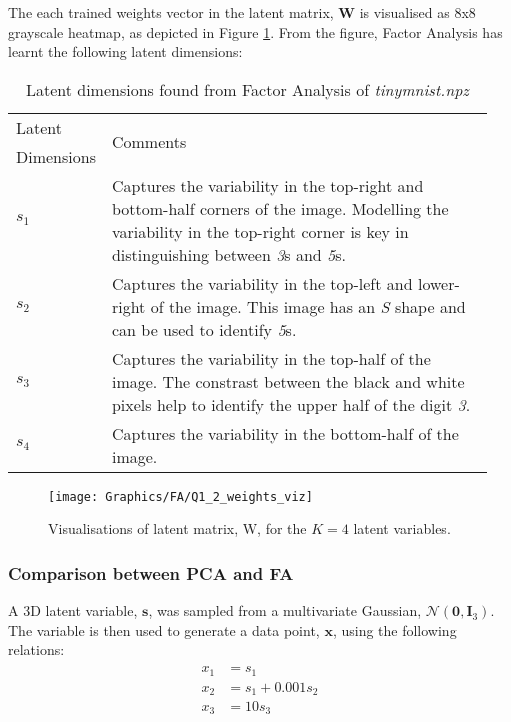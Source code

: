\documentclass[a4paper,12pt]{article}
\newcommand{\x}{\mathbf{x}}
\begin{document}
The each trained weights vector in the latent matrix, $\mathbf{W}$ is visualised as 8x8 grayscale heatmap, as depicted in Figure \ref{fig:FA/Q1_2_weights_viz}. From the figure, Factor Analysis has learnt the following latent dimensions:
\begin{table}[!htb]
\caption{Latent dimensions found from Factor Analysis of \textit{tinymnist.npz}}
\label{tab:FA/Q1_2_latent_dims}
\begin{tabular}{|p{0.15\linewidth}|p{0.8\linewidth}|} \hline
Latent & \multirow{2}{*}{Comments} \\ 
Dimensions & \\ \hline
$s_1$ & Captures the variability in the top-right and bottom-half corners of the image. Modelling the variability in the top-right corner is key in distinguishing between \textit{3}s and \textit{5}s. \\
$s_2$ & Captures the variability in the top-left and lower-right of the image. This image has an \textit{S} shape and can be used to identify \textit{5}s.\\
$s_3$ & Captures the variability in the top-half of the image. The constrast between the black and white pixels help to identify the upper half of the digit \textit{3}.\\
$s_4$ & Captures the variability in the bottom-half of the image. \\ \hline
\end{tabular}
\end{table}

\begin{figure}[!htb]
\centering
\texttt{[image: Graphics/FA/Q1\_2\_weights\_viz]}
\caption{Visualisations of latent matrix, W, for the $K=4$ latent variables.}
\label{fig:FA/Q1_2_weights_viz}
\end{figure}

\clearpage
\subsubsection{Comparison between PCA and FA}
A 3D latent variable, $\mathbf{s}$, was sampled from a multivariate Gaussian, $\mathcal{N}(\mathbf{0}, \mathbf{I}_3)$. The variable is then used to generate a data point, $\x$, using the following relations:
\begin{align}
\begin{split}
x_1 & = s_1 \\
x_2 & = s_1 + 0.001 s_2 \\
x_3 & = 10 s_3
\end{split}
\end{align}
\end{document}
